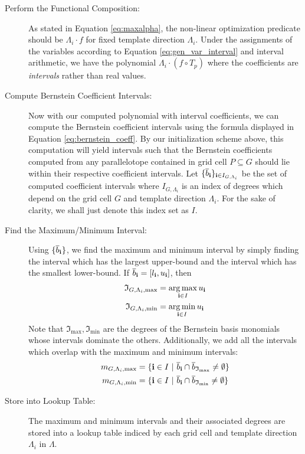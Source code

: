 \begin{description}
\item[Perform the Functional Composition:] As stated in Equation \ref{eq:maxalpha}, the non-linear optimization predicate should be $\Lambda_i\cdot f$ for fixed template direction $\Lambda_i$. Under the assignments of the variables according to Equation \ref{eq:gen_var_interval} and interval arithmetic, we have the polynomial $\Lambda_i\cdot(f \circ T_p)$ where the coefficients are \emph{intervals} rather than real values.

\item[Compute Bernstein Coefficient Intervals:] Now with our computed polynomial with interval coefficients, we can compute the Bernstein coefficient intervals using the formula displayed in Equation \ref{eq:bernstein_coeff}. By our initialization scheme above, this computation will yield intervals such that the Bernstein coefficients computed from any parallelotope contained in grid cell $P \subseteq G$ should lie within their respective coefficient intervals. Let $\{\overline{b}_{{\bf i}}\}_{{\bf i} \in I_{G,\Lambda_i}}$ be the set of computed coefficient intervals where $I_{G,\Lambda_i}$ is an index of degrees which depend on the grid cell $G$ and template direction $\Lambda_i$. For the sake of clarity, we shall just denote this index set as $I$.

\item[Find the Maximum/Minimum Interval:] Using $\{\overline{b}_{{\bf i}}\}$, we find the maximum and minimum interval by simply finding the interval which has the largest upper-bound and the interval which has the smallest lower-bound. If $\overline{b}_{{\bf i}} = [l_{\bf i}, u_{\bf i}]$, then
%
\begin{align}
  \mathfrak{I}_{G,\Lambda_i, \max} & = \operatorname*{arg\,max}_{{\bf i} \in I} u_{\bf i} \\
  \mathfrak{I}_{G,\Lambda_i, \min} & = \operatorname*{arg\,min}_{{\bf i} \in I} u_{\bf i}
\end{align}
%
Note that $\mathfrak{I}_{\max}, \mathfrak{I}_{\min}$ are the degrees of the Bernstein basis monomials whose intervals dominate the others. Additionally, we add all the intervals which overlap with the maximum and minimum intervals:
%
\begin{align}
  \begin{split}
      m_{G,\Lambda_i,\max} & = \{{\bf i} \in I ~|~ \overline{b}_{{\bf i}} \cap \overline{b}_{\mathfrak{I}_{\max}} \neq \emptyset \}\\
      m_{G,\Lambda_i,\min} & = \{{\bf i} \in I ~|~ \overline{b}_{{\bf i}} \cap \overline{b}_{\mathfrak{I}_{\min}} \neq \emptyset \}
  \end{split}
\end{align}

\item[Store into Lookup Table:] The maximum and minimum intervals and their associated degrees are stored into a lookup table indiced by each grid cell and template direction $\Lambda_i$ in $\Lambda$.
\end{description}

